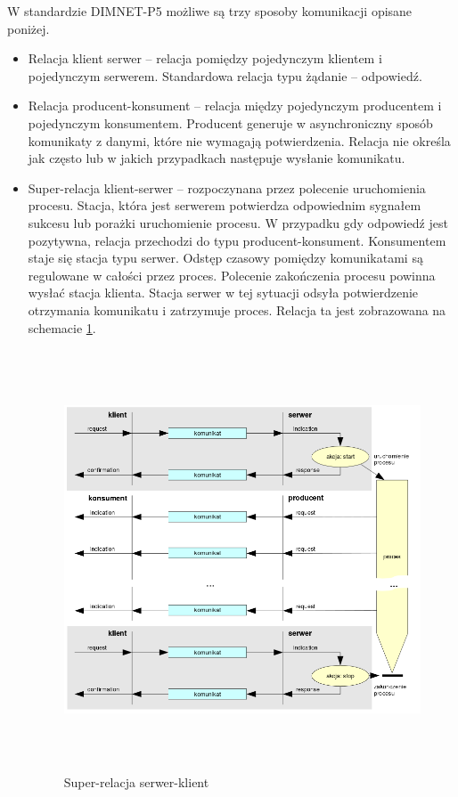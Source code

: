 W standardzie DIMNET-P5 możliwe są trzy sposoby komunikacji opisane poniżej.
\begin{itemize}
\item Relacja klient serwer -- relacja pomiędzy pojedynczym klientem i pojedynczym serwerem. Standardowa relacja typu żądanie -- odpowiedź.
\item Relacja producent-konsument -- relacja między pojedynczym producentem i pojedynczym konsumentem. Producent generuje w asynchroniczny sposób komunikaty z danymi, które nie wymagają potwierdzenia. Relacja nie określa jak często lub w jakich przypadkach następuje wysłanie komunikatu.
\item Super-relacja klient-serwer -- rozpoczynana przez polecenie uruchomienia procesu. Stacja, która jest serwerem potwierdza odpowiednim sygnałem sukcesu lub porażki uruchomienie procesu. W przypadku gdy odpowiedź jest pozytywna, relacja przechodzi do typu producent-konsument. Konsumentem staje się stacja typu serwer. Odstęp czasowy pomiędzy komunikatami są regulowane w całości przez proces. Polecenie zakończenia procesu powinna wysłać stacja klienta. Stacja serwer w tej sytuacji odsyła potwierdzenie otrzymania komunikatu i zatrzymuje proces. Relacja ta jest zobrazowana na schemacie \ref{fig:dimnetp5}.

	\begin{figure}[t]
		\centerline{\includegraphics[height=125mm]{./img/dimnet-p5.png}}
		\caption[Super-relacja serwer-klient]{Super-relacja serwer-klient \cite{arex-materials}}
		\label{fig:dimnetp5}
	\end{figure}
\end{itemize}

